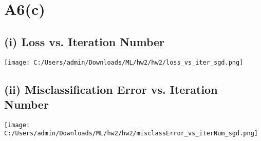 \documentclass{article}
\begin{document}
\section*{A6(c)}

\subsection*{(i) Loss vs. Iteration Number}
\begin{center}
    \texttt{[image: C:/Users/admin/Downloads/ML/hw2/hw2/loss\_vs\_iter\_sgd.png]}
\end{center}

\subsection*{(ii) Misclassification Error vs. Iteration Number}
\begin{center}
    \texttt{[image: C:/Users/admin/Downloads/ML/hw2/hw2/misclassError\_vs\_iterNum\_sgd.png]}
\end{center}
\end{document}
